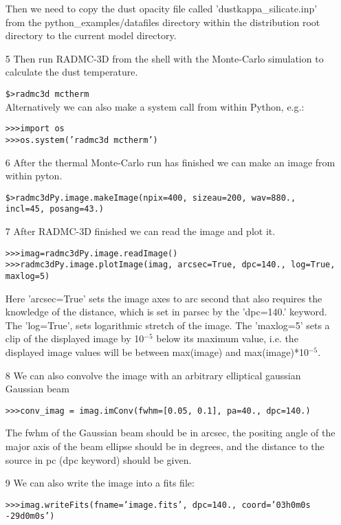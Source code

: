 \documentclass[12pt]{article}
\begin{document}
\begin{itemize}
Then we need to copy the dust opacity file called 'dustkappa\_silicate.inp' from the python\_examples/datafiles directory
within the distribution root directory to the current model directory. 

\item[5] Then run RADMC-3D from the shell with the Monte-Carlo simulation to calculate the dust temperature.

{\tt \$>radmc3d mctherm}\\

Alternatively we can also make a system call from within Python, e.g.:

{\tt>>>import os}\\
{\tt>>>os.system('radmc3d mctherm')}
\item[6] After the thermal Monte-Carlo run has finished we can make an image from within pyton. 

{\tt \$>radmc3dPy.image.makeImage(npix=400, sizeau=200, wav=880., incl=45, posang=43.)}\\
\item[7] After RADMC-3D finished we can read the image and plot it. 

{\tt>>>imag=radmc3dPy.image.readImage()}\\
{\tt>>>radmc3dPy.image.plotImage(imag, arcsec=True, dpc=140., log=True, maxlog=5)}

Here 'arcsec=True' sets the image axes to arc second that also requires the knowledge of the distance, 
which is set in parsec by the 'dpc=140.' keyword. The 'log=True', sets logarithmic stretch of the image.
The 'maxlog=5' sets a clip of the displayed image by 10$^{-5}$ below its maximum value, i.e. the
displayed image values will be between max(image) and max(image)*10$^{-5}$.

\item[8] We can also convolve the image with an arbitrary elliptical gaussian Gaussian beam

{\tt>>>conv\_imag = imag.imConv(fwhm=[0.05, 0.1], pa=40., dpc=140.)}

The fwhm of the Gaussian beam should be in arcsec,  the positing angle of the major axis of the beam ellipse
should be in degrees, and the distance to the source in pc (dpc keyword) should be given. 

\item[9] We can also write the image into a fits file:

{\tt>>>imag.writeFits(fname='image.fits', dpc=140., coord='03h0m0s -29d0m0s')}



\end{itemize}
\end{document}
